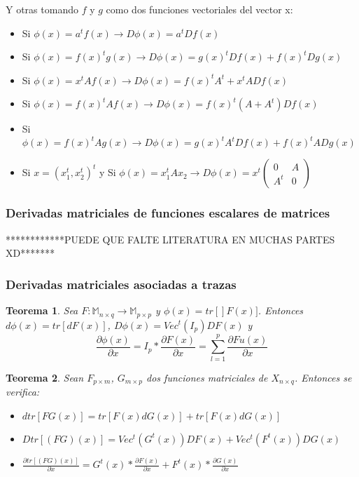 \documentclass{article}
\theoremstyle{theorem-style}  %
\newtheorem{theorem}{Teorema}[section]  %
\theoremstyle{definition-style}
\theoremstyle{example-style}
\theoremstyle{exercise-style}
\begin{document}
	Y otras tomando $f$ y $g$ como dos funciones vectoriales del vector x:
	
	\begin{itemize}
		\item Si $\phi(x) = a^tf(x) \rightarrow D\phi(x) = a^tDf(x)$
		\item  Si $\phi(x) = f(x)^tg(x) \rightarrow D\phi(x) = g(x)^tDf(x)+ f(x)^tDg(x)$
		\item Si $\phi(x) = x^tAf(x) \rightarrow D\phi(x) = f(x)^t A^t + x^tADf(x)$
		\item Si $\phi(x) = f(x)^tAf(x) \rightarrow D\phi(x) = f(x)^t(A+A^t)Df(x)$
		\item Si $\phi(x) = f(x)^tAg(x) \rightarrow D\phi(x) = g(x)^tA^tDf(x)+ f(x)^tADg(x)$
		\item Si $x=(x_1^t,x_2^t)^t$ y Si $\phi(x) = x_1^tAx_2 \rightarrow D\phi(x) = x^t (\begin{array}{cc}
		0 & A\\
		A^t  & 0
		\end{array})$ 
	\end{itemize}
	
	\subsubsection{Derivadas matriciales de funciones escalares de matrices}
	
	
	************PUEDE QUE FALTE LITERATURA EN MUCHAS PARTES XD*******
	
	\subsubsection*{Derivadas matriciales asociadas a trazas}
	
	\begin{theorem}
		Sea $F:\mathbb{M}_{n\times q}\rightarrow \mathbb{M}_{p\times p}$ y $\phi (x) = tr[]F(x)]$. Entonces $d\phi(x)= tr[dF(x)]$, $D\phi(x)= Vec^t(I_p)DF(x)$ y 
		$$ \frac{\partial \phi(x)}{\partial x} = I_p* \frac{\partial F(x)}{\partial x} = \sum_{l=1}^{p} \frac{\partial Fu(x)}{\partial x} $$ 
	\end{theorem}
	
	\begin{theorem}
		Sean $F_{p\times m}$, $G_{m\times p}$ dos funciones matriciales de $X_{n\times q}$. Entonces se verifica:
		\begin{itemize}
			\item $dtr[FG(x)] = tr[F(x)dG(x)]+ tr[F(x)dG(x)]$
			\item $Dtr[(FG)(x)] = Vec^t(G^t(x))DF(x) + Vec^t(F^t(x))DG(x)$
			\item $ \frac{\partial tr[(FG)(x)]}{\partial x} = G^t(x) * \frac{\partial F(x)}{\partial x} + F^t(x) * \frac{\partial G(x)}{\partial x}$
		\end{itemize}
	\end{theorem}
	
\end{document}
